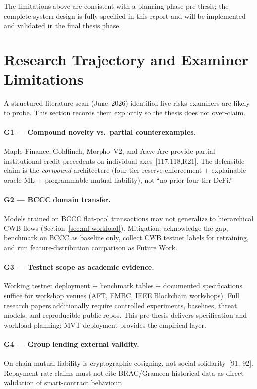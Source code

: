 \documentclass[12pt, a4paper]{report}
\begin{document}
The limitations above are consistent with a planning-phase pre-thesis; the complete system design is fully specified in this report and will be implemented and validated in the final thesis phase.

\section{Research Trajectory and Examiner Limitations}
\label{sec:research-limitations}

A structured literature scan (June~2026) identified five risks examiners are likely to probe. This section records them explicitly so the thesis does not over-claim.

\paragraph{G1 --- Compound novelty vs.\ partial counterexamples.}
Maple Finance, Goldfinch, Morpho~V2, and Aave Arc provide partial institutional-credit precedents on individual axes~[117,118,R21]. The defensible claim is the \textit{compound} architecture (four-tier reserve enforcement + explainable oracle ML + programmable mutual liability), not ``no prior four-tier DeFi.''

\paragraph{G2 --- BCCC domain transfer.}
Models trained on BCCC flat-pool transactions may not generalize to hierarchical CWB flows (Section~\ref{sec:ml-workload}). Mitigation: acknowledge the gap, benchmark on BCCC as baseline only, collect CWB testnet labels for retraining, and run feature-distribution comparison as Future Work.

\paragraph{G3 --- Testnet scope as academic evidence.}
Working testnet deployment + benchmark tables + documented specifications suffice for workshop venues (AFT, FMBC, IEEE Blockchain workshops). Full research papers additionally require controlled experiments, baselines, threat models, and reproducible public repos. This pre-thesis delivers specification and workload planning; MVT deployment provides the empirical layer.

\paragraph{G4 --- Group lending external validity.}
On-chain mutual liability is cryptographic cosigning, not social solidarity~[91, 92]. Repayment-rate claims must not cite BRAC/Grameen historical data as direct validation of smart-contract behaviour.
\end{document}
